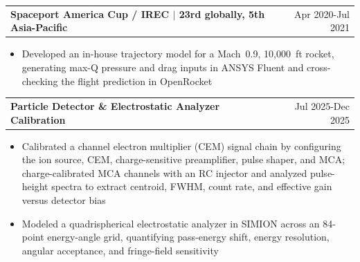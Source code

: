 \documentclass[10pt,letterpaper]{article}
\makeatletter
\newcommand{\resumeProjectHeading}[2]{%
  \par\noindent\begin{tabular*}{\textwidth}{@{\extracolsep{\fill}}l r}
    \textbf{#1} & #2
  \end{tabular*}\par\vspace{-1.0pt}%
}
\newcommand{\resumeItemsStart}{\begin{itemize}}
\newcommand{\resumeItemsEnd}{\end{itemize}\vspace{-0.5pt}}
\newcommand{\resumeItem}[1]{\item #1}
\makeatother
\begin{document}
\resumeProjectHeading{Spaceport America Cup / IREC $\mid$ 23rd globally, 5th Asia-Pacific}{Apr 2020-Jul 2021}
\resumeItemsStart
  \resumeItem{Developed an in-house trajectory model for a Mach~0.9, 10,000~ft rocket, generating max-Q pressure and drag inputs in ANSYS Fluent and cross-checking the flight prediction in OpenRocket}
\resumeItemsEnd

\resumeProjectHeading{Particle Detector \& Electrostatic Analyzer Calibration}{Jul 2025-Dec 2025}
\resumeItemsStart
  \resumeItem{Calibrated a channel electron multiplier (CEM) signal chain by configuring the ion source, CEM, charge-sensitive preamplifier, pulse shaper, and MCA; charge-calibrated MCA channels with an RC injector and analyzed pulse-height spectra to extract centroid, FWHM, count rate, and effective gain versus detector bias}
  \resumeItem{Modeled a quadrispherical electrostatic analyzer in SIMION across an 84-point energy-angle grid, quantifying pass-energy shift, energy resolution, angular acceptance, and fringe-field sensitivity}
\resumeItemsEnd
\end{document}
